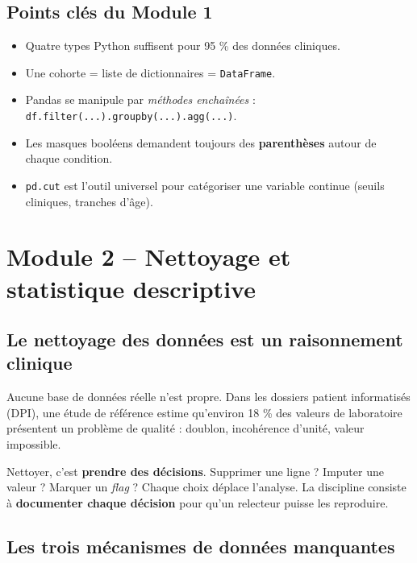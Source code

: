 \documentclass[11pt,a4paper]{article}
\begin{document}
\subsection{Points cl\'es du Module 1}

\begin{itemize}
  \item Quatre types Python suffisent pour 95 \% des donn\'ees cliniques.
  \item Une cohorte = liste de dictionnaires = \texttt{DataFrame}.
  \item Pandas se manipule par \emph{m\'ethodes encha\^in\'ees} :
        \texttt{df.filter(...).groupby(...).agg(...)}.
  \item Les masques bool\'eens demandent toujours des \textbf{parenth\`eses}
        autour de chaque condition.
  \item \texttt{pd.cut} est l'outil universel pour cat\'egoriser une
        variable continue (seuils cliniques, tranches d'\^age).
\end{itemize}

\newpage


\section{Module 2 -- Nettoyage et statistique descriptive}

\subsection{Le nettoyage des donn\'ees est un raisonnement clinique}

Aucune base de donn\'ees r\'eelle n'est propre. Dans les dossiers patient
informatis\'es (DPI), une \'etude de r\'ef\'erence
\citep{weiskopf2013methods} estime qu'environ 18 \% des valeurs de
laboratoire pr\'esentent un probl\`eme de qualit\'e : doublon,
incoh\'erence d'unit\'e, valeur impossible.

Nettoyer, c'est \textbf{prendre des d\'ecisions}. Supprimer une ligne ?
Imputer une valeur ? Marquer un \emph{flag} ? Chaque choix d\'eplace
l'analyse. La discipline consiste \`a \textbf{documenter chaque
d\'ecision} pour qu'un relecteur puisse les reproduire.

\subsection{Les trois m\'ecanismes de donn\'ees manquantes}
\end{document}
